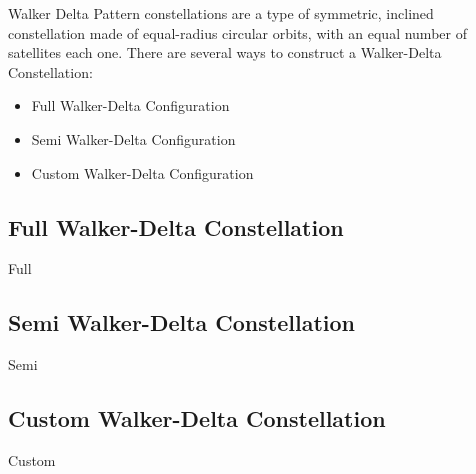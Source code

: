 
Walker Delta Pattern constellations are a type of symmetric, inclined constellation made of equal-radius circular orbits, with an equal number of satellites each one.
There are several ways to construct a Walker-Delta Constellation:

\begin{itemize}
\item Full Walker-Delta Configuration
\item Semi Walker-Delta Configuration
\item Custom Walker-Delta Configuration
\end{itemize}

\subsection{Full Walker-Delta Constellation}
{Full}

\subsection{Semi Walker-Delta Constellation}
{Semi}

\subsection{Custom Walker-Delta Constellation}
{Custom}


